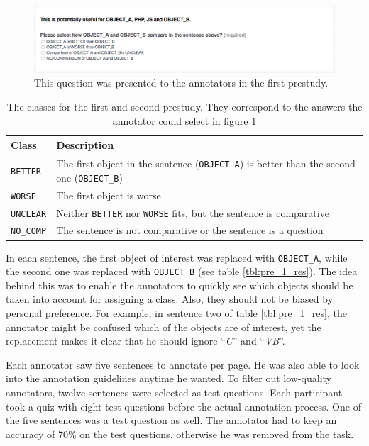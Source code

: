 \begin{figure}[h]
\centering
\caption{This question was presented to the annotators in the first prestudy.}
\label{img:1_question}
\includegraphics[width=1\linewidth]{images/prestudy/1_question}

\end{figure}

\begin{table}[h]
\centering
\caption{The classes for the first and second prestudy. They correspond to the answers the annotator could select in figure \ref{img:1_question}}
\label{tbl:prestudyclasses-a}
\begin{tabularx}{\linewidth}{lX}

\toprule
Class & Description \\ \midrule
\texttt{BETTER} & The first object in the sentence (\texttt{OBJECT\_A}) is better than the second one (\texttt{OBJECT\_B})\\
\texttt{WORSE} & The first object is worse \\
\texttt{UNCLEAR} & Neither \texttt{BETTER} nor \texttt{WORSE} fits, but the sentence is comparative\\
\texttt{NO\_COMP} & The sentence is not comparative or the sentence is a question\\
\bottomrule
\end{tabularx}
\end{table}

In each sentence, the first object of interest was replaced with \texttt{OBJECT\_A}, while the second one was replaced with \texttt{OBJECT\_B} (see table \ref{tbl:pre_1_res}). The idea behind this was to enable the annotators to quickly see which objects should be taken into account for assigning a class. Also, they should not be biased by personal preference. For example, in sentence two of table \ref{tbl:pre_1_res}, the annotator might be confused which of the objects are of interest, yet the replacement makes it clear that he should ignore \enquote{\emph{C}} and \enquote{\emph{VB}}. 

Each annotator saw five sentences to annotate per page. He was also able to look into the annotation guidelines anytime he wanted. To filter out low-quality annotators, twelve sentences were selected as test questions. Each participant took a quiz with eight test questions before the actual annotation process. One of the five sentences was a test question as well. The annotator had to keep an accuracy of 70\% on the test questions, otherwise he was removed from the task.

